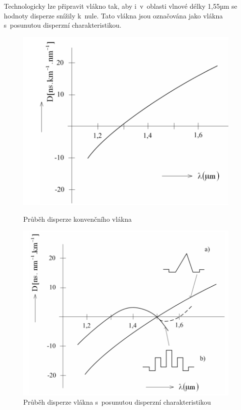 Technologicky lze připravit vlákno tak, aby i~v~oblasti vlnové délky 1,55µm se hodnoty disperze snížily k~nule. Tato vlákna jsou označována jako vlákna s~posunutou disperzní charakteristikou.
\begin{figure}[htbp]
  \centering
  \begin{minipage}{0.45\textwidth}
    \small
    \centering
    \includegraphics[width=\linewidth]{obrazky/chromdisp1.png}
    \caption{Průběh disperze konvenčního vlákna}
    \label{fig:disperze-1}
  \end{minipage}
  \hfill
  \begin{minipage}{0.45\textwidth}
    \small
    \centering
    \includegraphics[width=\linewidth]{obrazky/chromdisp2.png}
    \caption{Průběh disperze vlákna s~posunutou disperzní charakteristikou}
    \label{fig:disperze-2}
  \end{minipage}
\end{figure}
\FloatBarrier

